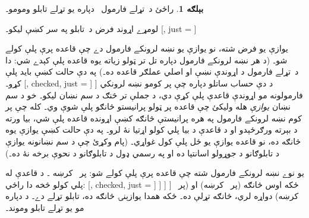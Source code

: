\documentclass[12pt,a4paper,oneside]{report}
\newcommand{\olfileid}[3]{\gdef\pspart{#1}\gdef\pschapter{#2}\gdef\pssection{#3}}
\gdef\pspart{#2}\gdef\pschapter{#3}\gdef\pssection{}%
\newenvironment{oltableau}
  {\center\LTR\tableau{}}
  {\endtableau\endLTR\endcenter}
\theoremstyle{definition}
\newtheorem{ex}[thm]{بېلګه}
\begin{document}
\label{olpseg:OLP-0103-B004:start}
\olfileid{fol}{tab}{pro}
\label{olpseg:OLP-0103-B004:end}

\label{olpseg:OLP-0103-B005:start}
\label{olpseg:OLP-0103-B005:end}

\label{olpseg:OLP-0103-B006:start}
\begin{ex}
راځئ د~تړلے فارمول~ دپاره يو تړلے
تابلو ومومو۔
\label{olpseg:OLP-0103-B006:end}

\label{olpseg:OLP-0103-B007:start}
لومړے اړوند فرض د~تابلو په سر کښې ليکو۔
\begin{oltableau}
  [,
    just = \TAss]
\end{oltableau}
\label{olpseg:OLP-0103-B007:end}

\label{olpseg:OLP-0103-B008:start}
يوازې يو فرض شته، نو يوازې يو نښه لرونکے فارمول دے چې قاعده پرې
پلې کولے شو۔ (د هر نښه لرونکے فارمول دپاره تل تر ټولو زياته يوه
قاعده پلې کېدے شي: دا د~تړلے فارمول د اړوندې نښې او
اصلي عملګر قاعده ده۔) په دې حالت کښې بايد
\LR{$\TRule{\False}{\lif}$} پلې کړو۔
\begin{oltableau}
  [,
    checked, just = \TAss
    [\sFmla{\True}{\formula{A} \land \formula{B}},
      just={\TRule{\False}{\lif}[1]}
      [\sFmla{\False}{\formula{A}}, just={\TRule{\False}{\lif}[1]}]
    ]
  ]
\end{oltableau}
د دې حساب ساتلو دپاره چې پر کومو نښه لرونکي فارمولونه مو اړوندې
قاعدې پلې کړې دي، د جملې تر څنګ د سم نښان ليکو۔ خو د سم نښان
\emph{يوازې} هله وليکئ چې قاعده پر ټولو پرانيستو څانګو پلې شوې
وي۔ کله چې پر کوم نښه لرونکے فارمول په هره پرانيستې څانګه کښې
اړونده قاعده پلې شي، بيا ورته د بېرته ورګرځېدو او د قاعدې د بيا
پلي کولو اړتيا نۀ لرو۔ په دې حالت کښې يوازې يوه څانګه ده، نو قاعده
يوازې يو ځل پلې کول غواړي۔ (پام وکړئ چې د سم نښانونه يوازې د
تابلوګانو د جوړولو اسانتيا ده او په رسمي ډول د تابلوګانو د نحوې
برخه نۀ ده۔)
\label{olpseg:OLP-0103-B008:end}

\label{olpseg:OLP-0103-B009:start}
يو نوے نښه لرونکے فارمول شته چې قاعده پرې پلې کولے شو: پر
~کرښه ۔ د
\LR{$\TRule{\True}{\land}$} قاعدې له پلي کولو څخه دا راځي:
\begin{oltableau}
  [,
    checked, just = \TAss
    [\sFmla{\True}{\formula{A} \land \formula{B}},
      just={\TRule{\False}{\lif}[1]}, checked
      [\sFmla{\False}{\formula{A}}, just={\TRule{\False}{\lif}[1]}
        [\sFmla{\True}{\formula{A}}, just={\TRule{\True}{\land}[2]}
          [\sFmla{\True}{\formula{B}}, just={\TRule{\True}{\land}[2]}, close
          ]
        ]
      ]
    ]
  ]
\end{oltableau}
ځکه اوس څانګه  (پر~ کرښه) او
 (پر~ کرښه) دواړه لري، څانګه تړلې ده۔
ځکه همدا يوازېنۍ څانګه ده، تابلو تړلے دے۔ د
 دپاره مو يو تړلے تابلو وموند۔
\end{ex}
\label{olpseg:OLP-0103-B009:end}
\end{document}
